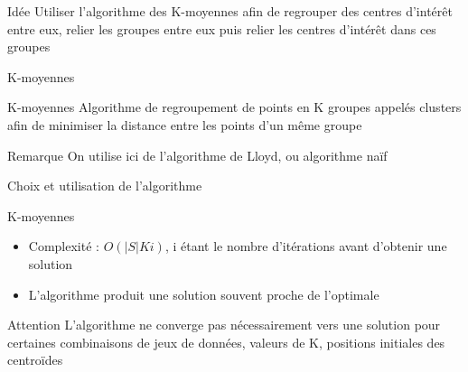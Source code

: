 \documentclass[aspectratio=43,11pt]{beamer}
\begin{document}
\begin{frame}{Idée}
    Utiliser l'algorithme des K-moyennes afin de regrouper des centres d'intérêt entre eux, relier les groupes entre eux puis relier les centres d'intérêt dans ces groupes
\end{frame}
\begin{frame}{K-moyennes}
    \begin{block}{K-moyennes}
        Algorithme de regroupement de points en K groupes appelés clusters afin de minimiser la distance entre les points d'un même groupe
    \end{block}
    \begin{exampleblock}{Remarque}
        On utilise ici de l'algorithme de Lloyd, ou algorithme naïf
    \end{exampleblock}
\end{frame}
\begin{frame}{Choix et utilisation de l'algorithme}
\end{frame}
\begin{frame}{K-moyennes}
    \begin{itemize}
        \item Complexité : $O(|S| K i)$, i étant le nombre d'itérations avant d'obtenir une solution
        \item L'algorithme produit une solution souvent proche de l'optimale
    \end{itemize}
    \begin{alertblock}{Attention}
        L'algorithme ne converge pas nécessairement vers une solution pour certaines combinaisons de jeux de données, valeurs de K, positions initiales des centroïdes
    \end{alertblock}
\end{frame}
\end{document}
